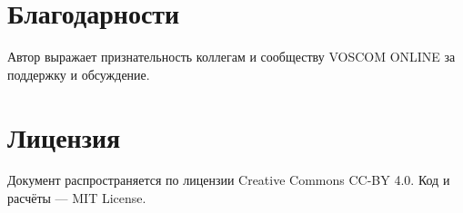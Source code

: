 \documentclass[12pt,a4paper]{article}
\begin{document}
\section*{Благодарности}
Автор выражает признательность коллегам и сообществу VOSCOM ONLINE за поддержку и обсуждение.

\section*{Лицензия}
Документ распространяется по лицензии Creative Commons CC-BY 4.0.  
Код и расчёты — MIT License.  
\end{document}
